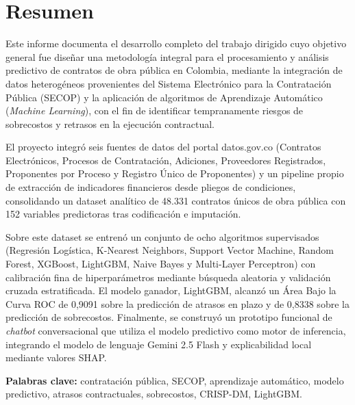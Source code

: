 \documentclass[12pt,letterpaper,oneside]{report}
\begin{document}
\chapter*{Resumen}

\noindent Este informe documenta el desarrollo completo del trabajo dirigido cuyo
objetivo general fue diseñar una metodología integral para el procesamiento y
análisis predictivo de contratos de obra pública en Colombia, mediante la
integración de datos heterogéneos provenientes del Sistema Electrónico para la
Contratación Pública (SECOP) y la aplicación de algoritmos de Aprendizaje
Automático (\emph{Machine Learning}), con el fin de identificar tempranamente
riesgos de sobrecostos y retrasos en la ejecución contractual.

El proyecto integró seis fuentes de datos del portal datos.gov.co (Contratos
Electrónicos, Procesos de Contratación, Adiciones, Proveedores Registrados,
Proponentes por Proceso y Registro Único de Proponentes) y un pipeline propio de
extracción de indicadores financieros desde pliegos de condiciones, consolidando
un dataset analítico de 48.331 contratos únicos de obra pública con 152
variables predictoras tras codificación e imputación.

Sobre este dataset se entrenó un conjunto de ocho algoritmos supervisados
(Regresión Logística, K-Nearest Neighbors, Support Vector Machine, Random
Forest, XGBoost, LightGBM, Naive Bayes y Multi-Layer Perceptron) con calibración
fina de hiperparámetros mediante búsqueda aleatoria y validación cruzada
estratificada. El modelo ganador, LightGBM, alcanzó un Área Bajo la Curva ROC de
0,9091 sobre la predicción de atrasos en plazo y de 0,8338 sobre la predicción
de sobrecostos. Finalmente, se construyó un prototipo funcional de
\emph{chatbot} conversacional que utiliza el modelo predictivo como motor de
inferencia, integrando el modelo de lenguaje Gemini 2.5 Flash y explicabilidad
local mediante valores SHAP.

\vspace{0.5cm}
\noindent\textbf{Palabras clave:} contratación pública, SECOP, aprendizaje
automático, modelo predictivo, atrasos contractuales, sobrecostos, CRISP-DM,
LightGBM.

\renewcommand{\contentsname}{Tabla de contenido}
\renewcommand{\listtablename}{Índice de tablas}
\renewcommand{\listfigurename}{Índice de figuras}
\end{document}
